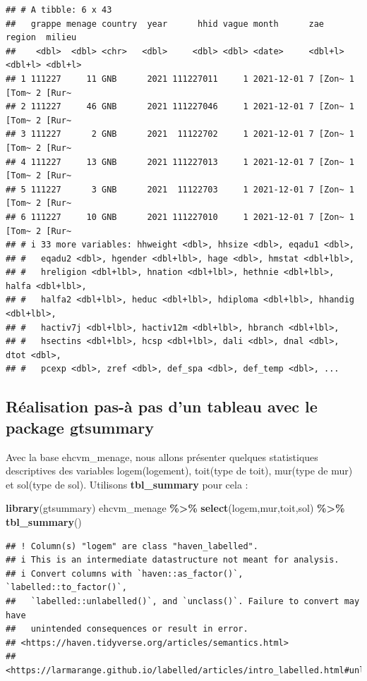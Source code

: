 \documentclass[
]{article}
\newenvironment{Shaded}{\begin{snugshade}}{\end{snugshade}}
\newcommand{\FunctionTok}[1]{\textcolor[rgb]{0.13,0.29,0.53}{\textbf{#1}}}
\newcommand{\NormalTok}[1]{#1}
\newcommand{\SpecialCharTok}[1]{\textcolor[rgb]{0.81,0.36,0.00}{\textbf{#1}}}
\begin{document}
\begin{verbatim}
## # A tibble: 6 x 43
##   grappe menage country  year      hhid vague month      zae     region  milieu 
##    <dbl>  <dbl> <chr>   <dbl>     <dbl> <dbl> <date>     <dbl+l> <dbl+l> <dbl+l>
## 1 111227     11 GNB      2021 111227011     1 2021-12-01 7 [Zon~ 1 [Tom~ 2 [Rur~
## 2 111227     46 GNB      2021 111227046     1 2021-12-01 7 [Zon~ 1 [Tom~ 2 [Rur~
## 3 111227      2 GNB      2021  11122702     1 2021-12-01 7 [Zon~ 1 [Tom~ 2 [Rur~
## 4 111227     13 GNB      2021 111227013     1 2021-12-01 7 [Zon~ 1 [Tom~ 2 [Rur~
## 5 111227      3 GNB      2021  11122703     1 2021-12-01 7 [Zon~ 1 [Tom~ 2 [Rur~
## 6 111227     10 GNB      2021 111227010     1 2021-12-01 7 [Zon~ 1 [Tom~ 2 [Rur~
## # i 33 more variables: hhweight <dbl>, hhsize <dbl>, eqadu1 <dbl>,
## #   eqadu2 <dbl>, hgender <dbl+lbl>, hage <dbl>, hmstat <dbl+lbl>,
## #   hreligion <dbl+lbl>, hnation <dbl+lbl>, hethnie <dbl+lbl>, halfa <dbl+lbl>,
## #   halfa2 <dbl+lbl>, heduc <dbl+lbl>, hdiploma <dbl+lbl>, hhandig <dbl+lbl>,
## #   hactiv7j <dbl+lbl>, hactiv12m <dbl+lbl>, hbranch <dbl+lbl>,
## #   hsectins <dbl+lbl>, hcsp <dbl+lbl>, dali <dbl>, dnal <dbl>, dtot <dbl>,
## #   pcexp <dbl>, zref <dbl>, def_spa <dbl>, def_temp <dbl>, ...
\end{verbatim}

\subsection{Réalisation pas-à pas d'un tableau avec le package
gtsummary}\label{ruxe9alisation-pas-uxe0-pas-dun-tableau-avec-le-package-gtsummary}

Avec la base ehcvm\_menage, nous allons présenter quelques statistiques
descriptives des variables logem(logement), toit(type de toit), mur(type
de mur) et sol(type de sol). Utilisons \textbf{tbl\_summary} pour cela :

\begin{Shaded}
\begin{Highlighting}[]
\FunctionTok{library}\NormalTok{(gtsummary)}
\NormalTok{ehcvm\_menage }\SpecialCharTok{\%\textgreater{}\%} \FunctionTok{select}\NormalTok{(logem,mur,toit,sol) }\SpecialCharTok{\%\textgreater{}\%} \FunctionTok{tbl\_summary}\NormalTok{()}
\end{Highlighting}
\end{Shaded}

\begin{verbatim}
## ! Column(s) "logem" are class "haven_labelled".
## i This is an intermediate datastructure not meant for analysis.
## i Convert columns with `haven::as_factor()`, `labelled::to_factor()`,
##   `labelled::unlabelled()`, and `unclass()`. Failure to convert may have
##   unintended consequences or result in error.
## <https://haven.tidyverse.org/articles/semantics.html>
## <https://larmarange.github.io/labelled/articles/intro_labelled.html#unlabelled>
\end{verbatim}
\end{document}
